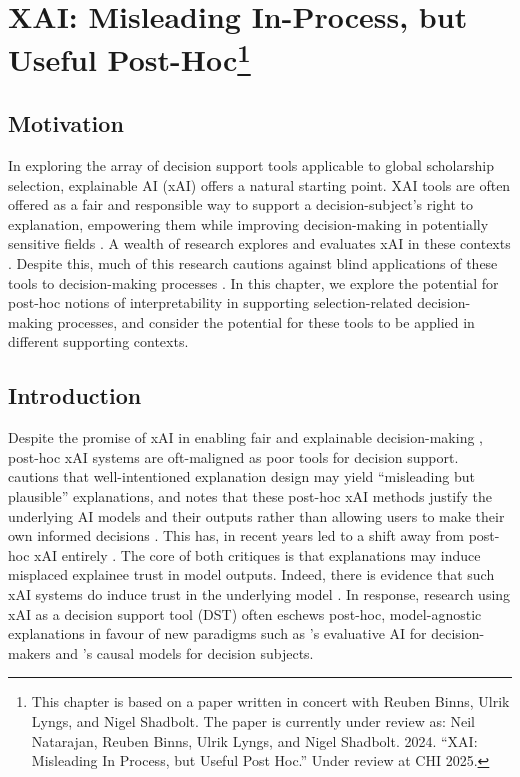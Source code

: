 \chapter[XAI]{\label{ch:xai}XAI: Misleading In-Process, but Useful Post-Hoc\footnote{This chapter is based on a paper written in concert with Reuben Binns, Ulrik Lyngs, and Nigel Shadbolt. The paper is currently under review as: Neil Natarajan, Reuben Binns, Ulrik Lyngs, and Nigel Shadbolt. 2024. “XAI: Misleading In Process, but Useful Post Hoc.” Under review at CHI 2025.}}

\minitoc

\section{Motivation}
In exploring the array of decision support tools applicable to global scholarship selection, explainable AI (xAI) offers a natural starting point. XAI tools are often offered as a fair and responsible way to support a decision-subject's right to explanation, empowering them while improving decision-making in potentially sensitive fields \cite{Goodman_Flaxman_2017}. A wealth of research explores and evaluates xAI in these contexts \cite{molnar_interpretable_2019,barocas_hidden_2020,wachter_counterfactual_2017,Barocas_Hood_Ziewitz_2013,raghavan2020mitigating}. Despite this, much of this research cautions against blind applications of these tools to decision-making processes \cite{Lipton,miller_explainable_2023,kumar_problems_2020,Bastounis_Campodonico_vanderSchaar_Adcock_Hansen_2024}. In this chapter, we explore the potential for post-hoc notions of interpretability in supporting selection-related decision-making processes, and consider the potential for these tools to be applied in different supporting contexts.

\section{Introduction}
Despite the promise of xAI in enabling fair and explainable decision-making \cite{Goodman_Flaxman_2017}, post-hoc xAI systems are oft-maligned as poor tools for decision support. \textcite{Lipton} cautions that well-intentioned explanation design may yield ``misleading but plausible'' explanations, and \textcite{miller_explainable_2023} notes that these post-hoc xAI methods justify the underlying AI models and their outputs rather than allowing users to make their own informed decisions \cite{miller_explainable_2023}. This has, in recent years led to a shift away from post-hoc xAI entirely \cite{Lipton,miller_explainable_2023,kumar_problems_2020,Bastounis_Campodonico_vanderSchaar_Adcock_Hansen_2024}. The core of both critiques is that explanations may induce misplaced explainee trust in model outputs. Indeed, there is evidence that such xAI systems do induce trust in the underlying model \cite{lai_human_2019,jacobs_how_2021}. In response, research using xAI as a decision support tool (DST) often eschews post-hoc, model-agnostic explanations in favour of new paradigms such as \textcite{miller_explainable_2023}'s evaluative AI for decision-makers and \textcite{karimi_algorithmic_2021}'s causal models for decision subjects.

